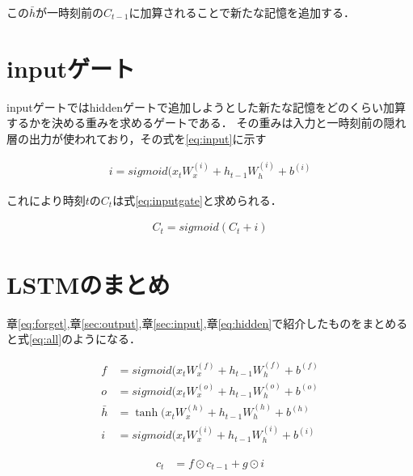 \documentclass[a4j,11pt,report]{jsbook}
\begin{document}
この$\bar{h}$が一時刻前の$C_{t-1}$に加算されることで新たな記憶を追加する．


\section{inputゲート\label{sec:input}}

inputゲートではhiddenゲートで追加しようとした新たな記憶をどのくらい加算するかを決める重みを求めるゲートである．
その重みは入力と一時刻前の隠れ層の出力が使われており，その式を\ref{eq:input}に示す


\begin{equation}
  \label{eq:input}
  \begin{split}
    i = sigmoid(x_{t}W_{x}^{(i)} + h_{t-1}W_{h}^{(i)} + b^{(i)}
  \end{split}
\end{equation}

これにより時刻$t$の$C_{t}$は式\ref{eq:inputgate}と求められる．

\begin{equation}
  \label{eq:inputgate}
  \begin{split}
    C_{t} = sigmoid (C_{t} + i )
  \end{split}
\end{equation}

\section{LSTMのまとめ}
章\ref{eq:forget},章\ref{sec:output},章\ref{sec:input},章\ref{eq:hidden}で紹介したものをまとめると式\ref{eq:all}のようになる．


\begin{equation}
  \label{eq:all}
  \begin{split}
    f &= sigmoid(x_{t}W_{x}^{(f)} + h_{t-1}W_{h}^{(f)} + b^{(f)} \\
    o &= sigmoid(x_{t}W_{x}^{(o)} + h_{t-1}W_{h}^{(o)} + b^{(o)} \\
    \bar{h} &= \tanh(x_{t}W_{x}^{(h)} + h_{t-1}W_{h}^{(h)} + b^{(h)} \\
    i &= sigmoid(x_{t}W_{x}^{(i)} + h_{t-1}W_{h}^{(i)} + b^{(i)}
  \end{split}
\end{equation}

\begin{equation}
  \label{eq:all2}
  \begin{split}
    c_{t} &= f \odot c_{t-1} + g \odot i
  \end{split}
\end{equation}
\end{document}
